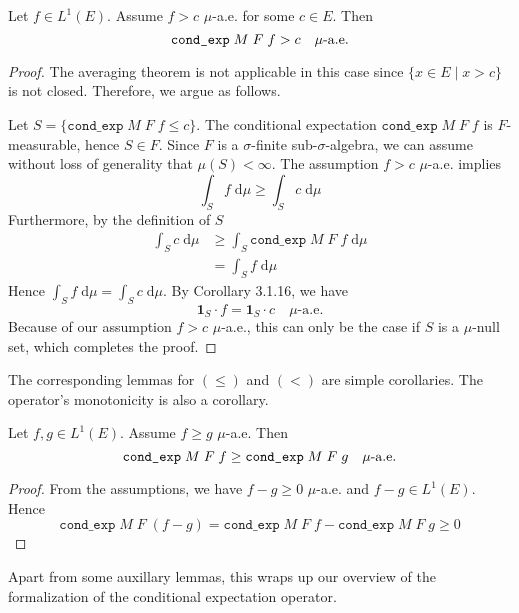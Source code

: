 \begin{lemma}
	Let $f \in L^1(E)$. Assume $f > c$ $\mu$-a.e. for some $c \in E$. Then 
	\[
		\normalfont\texttt{cond\_exp} \; M \; F \; f > c \quad \mu\textrm{-a.e.}
	\]
\end{lemma}
\begin{proof}
	The averaging theorem is not applicable in this case since $\{x \in E \;\vert\; x > c \}$ is not closed. Therefore, we argue as follows.
	
	Let $S = \{\texttt{cond\_exp} \; M \; F \; f \le c\}$. The conditional expectation $\texttt{cond\_exp} \; M \; F \; f$ is $F$-measurable, hence $S \in F$. Since $F$ is a $\sigma$-finite sub-$\sigma$-algebra, we can assume without loss of generality that $\mu(S) < \infty$.
	The assumption $f > c$ $\mu$-a.e. implies
	\[
		\int_S f \; \textrm{d} \mu \ge \int_S c \; \textrm{d} \mu
	\]
	Furthermore, by the definition of $S$
	\begin{align*}
		\int_S c \; \textrm{d} \mu &\ge \int_S \texttt{cond\_exp} \; M \; F \; f \; \textrm{d} \mu \\
		&= \int_S f \; \textrm{d} \mu
	\end{align*}
	Hence $\int_S f \; \textrm{d} \mu = \int_S c \; \textrm{d} \mu$. By Corollary 3.1.16, we have
	\[
		\mathbf{1}_S \cdot f = \mathbf{1}_S \cdot c \quad \mu\textrm{-a.e.}
	\]
	Because of our assumption $f > c$ $\mu$-a.e., this can only be the case if $S$ is a $\mu$-null set, which completes the proof.
\end{proof}

The corresponding lemmas for $(\le)$ and $(<)$ are simple corollaries. The operator's monotonicity is also a corollary.

\begin{corollary}
	Let $f, g \in L^1(E)$. Assume $f \ge g$ $\mu$-a.e. Then 
	\[
		\normalfont\texttt{cond\_exp} \; M \; F \; f \ge \texttt{cond\_exp} \; M \; F \; g \quad \mu\textrm{-a.e.}
	\]
\end{corollary}
\begin{proof}
	From the assumptions, we have $f - g \ge 0$ $\mu$-a.e. and $f - g \in L^1(E)$. Hence
	\[
		\texttt{cond\_exp} \; M \; F \; (f - g) = \texttt{cond\_exp} \; M \; F \; f - \texttt{cond\_exp} \; M \; F \; g \ge 0
	\]
\end{proof}

Apart from some auxillary lemmas, this wraps up our overview of the formalization of the conditional expectation operator.
